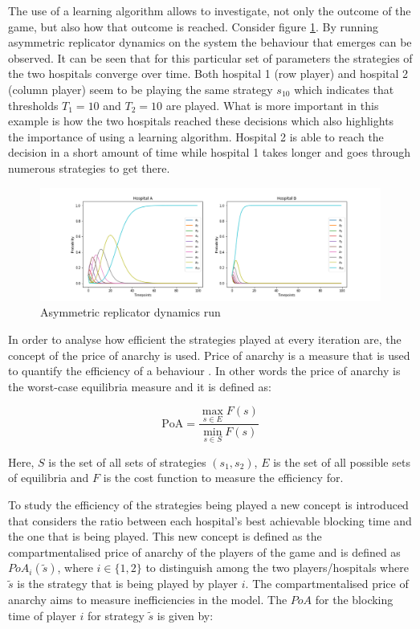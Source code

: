 The use of a learning algorithm allows to investigate, not only the outcome of 
the game, but also how that outcome is reached.
Consider figure \ref{fig:ard_by_itself}. 
By running asymmetric replicator dynamics on the system the behaviour that 
emerges can be observed.
It can be seen that for this particular set of parameters the strategies of 
the two hospitals converge over time. 
Both hospital 1 (row player) and hospital 2 (column player) seem to be playing 
the same strategy \(s_{10}\) which indicates that thresholds \(T_1 = 10\) and 
\(T_2 = 10\) are played.
What is more important in this example is how the two hospitals reached these
decisions which also highlights the importance of using a learning algorithm.
Hospital 2 is able to reach the decision in a short amount of time while 
hospital 1 takes longer and goes through numerous strategies to get there.

\begin{figure}[H]
    \centering
    \includegraphics[scale=0.4, trim=120 0 120 0]{imgs/asymmetric_rd/asymmetric_rd.png}
    \caption{Asymmetric replicator dynamics run}
    \label{fig:ard_by_itself}
\end{figure}

In order to analyse how efficient the strategies played at every iteration are, 
the concept of the price of anarchy is used.
Price of anarchy is a measure that is used to quantify the efficiency of a
behaviour \cite{roughgarden2005selfish}.
In other words the price of anarchy is the worst-case equilibria measure and it 
is defined as:

\begin{equation}\label{eq:general_price_of_anarchy}
    \text{PoA} = \frac{\max_{s \in E} F(s)}{\min_{s \in S} F(s)}
\end{equation}

Here, \(S\) is the set of all sets of strategies \((s_1, s_2)\), \(E\) is the 
set of all possible sets of equilibria and \(F\) is the cost function to 
measure the efficiency for. 

To study the efficiency of the strategies being played a new concept is 
introduced that considers the ratio between each hospital's best achievable 
blocking time and the one that is being played.
This new concept is defined as the compartmentalised price of anarchy of the 
players of the game and is defined as \(PoA_i(\tilde{s})\), where 
\(i \in \{1, 2\}\) to distinguish among the two players/hospitals where 
\(\tilde{s}\) is the strategy that is being played by player \( i \). 
The compartmentalised price of anarchy aims to measure inefficiencies in the 
model.
The \(PoA\) for the blocking time of player \(i\) for strategy \(\tilde{s}\) 
is given by:


